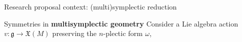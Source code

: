 \documentclass[beamer,10pt,handout]{standalone}  \Handouttrue
\begin{document}
\begin{frame}{Research proposal context: (multi)symplectic reduction}



\end{frame}
\note{
}


\begin{frame}[t]{Symmetries in \textbf{multisymplectic geometry}}
	Consider a Lie algebra action $v:\mathfrak{g} \to \mathfrak{X}(M)$  preserving the $n$-plectic form $\omega$,
	\vfill


\end{frame}
\end{document}
